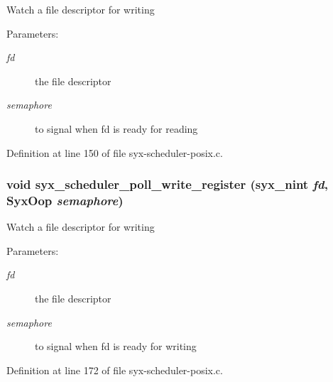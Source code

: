 Watch a file descriptor for writing

\begin{Desc}
\item[Parameters:]
\begin{description}
\item[{\em fd}]the file descriptor \item[{\em semaphore}]to signal when fd is ready for reading \end{description}
\end{Desc}


Definition at line 150 of file syx-scheduler-posix.c.\hypertarget{syx-scheduler-posix_8c_28eac1f77d3be9549426a9166ac5a9f3}{
\subsubsection{\setlength{\rightskip}{0pt plus 5cm}void syx\_\-scheduler\_\-poll\_\-write\_\-register ({\bf syx\_\-nint} {\em fd}, \/  {\bf SyxOop} {\em semaphore})}}
\label{syx-scheduler-posix_8c_28eac1f77d3be9549426a9166ac5a9f3}


Watch a file descriptor for writing

\begin{Desc}
\item[Parameters:]
\begin{description}
\item[{\em fd}]the file descriptor \item[{\em semaphore}]to signal when fd is ready for writing \end{description}
\end{Desc}


Definition at line 172 of file syx-scheduler-posix.c.